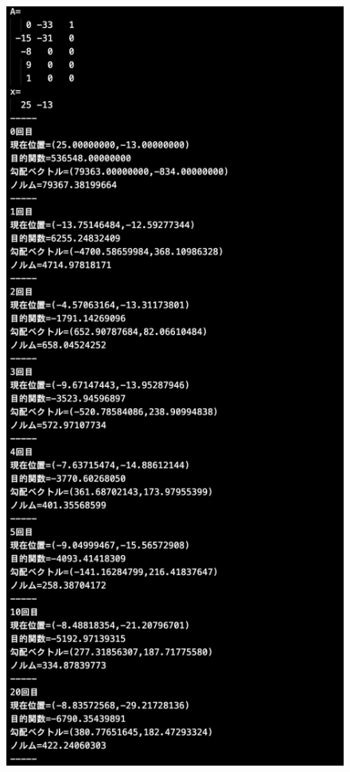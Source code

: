 \documentclass[12pt]{jarticle}
\begin{document}
\clearpage
\begin{figure}[h]
    \begin{center}
        \includegraphics[scale=0.2]{kadai1_2s_out2_3_1.png}
    \end{center}

\end{figure}
\end{document}
